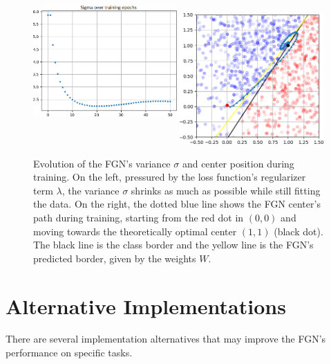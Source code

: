 \documentclass[12pt,oneside]{CUNY_PhD}
\begin{document}
\begin{figure}[!t]
    \centering
    \includegraphics[width=0.49\textwidth,height=6.35cm]{images/2D-single-neuron/2d-easy-sigma-training-cropped.png}
    \includegraphics[width=0.49\textwidth]{images/2D-single-neuron/2d-easy-center-path-cropped.png}
    \caption{Evolution of the FGN's variance $\sigma$ and center position during training. On the left, pressured by the loss function's regularizer term $\lambda$,  the variance $\sigma$ shrinks as much as possible while still fitting the data.  On the right, the dotted blue line shows the FGN center's path during training, starting from the red dot in $(0,0)$ and moving towards the theoretically optimal center $(1,1)$ (black dot). The black line is the class border and the yellow line is the FGN's predicted border, given by the weights $W$.}
    \label{fig:single-fgn-3}
\end{figure}

\section{Alternative Implementations}
There are several implementation alternatives that may improve the FGN's performance on specific tasks.
\end{document}
